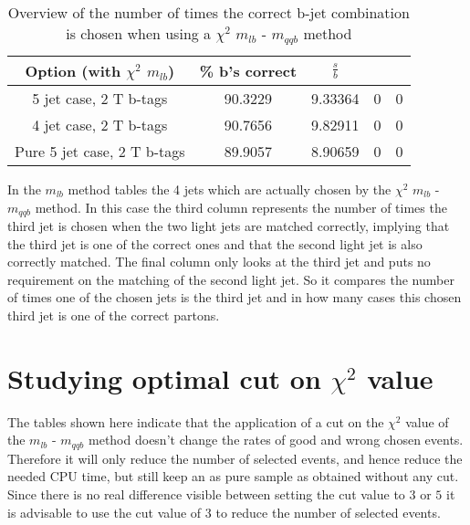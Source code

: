 \documentclass[a4paper,12pt]{report}
\begin{document}
 \begin{table}[!h] 
 \begin{tabular}{c|c|c|c|c} 
 \textbf{Option} (with $\chi^{2}$ $m_{lb}$) & \% b's correct   & $\frac{s}{b}$ &  &  \\ \hline 
 5 jet case,      2 T b-tags              & 90.3229 & 9.33364 & 0 & 0 \\ 
 4 jet case,      2 T b-tags              & 90.7656 & 9.82911 & 0 & 0 \\ 
 Pure 5 jet case, 2 T b-tags              & 89.9057 & 8.90659 & 0 & 0 \\ 
 \end{tabular} 
 \caption{Overview of the number of times the correct b-jet combination is chosen when using a $\chi^{2}$ $m_{lb}$ - $m_{qqb}$ method} 
 \end{table} 
In the $m_{lb}$ method tables the 4 jets which are actually chosen by the $\chi^{2}$ $m_{lb}$ - $m_{qqb}$ method. 
In this case the third column represents the number of times the third jet is chosen when the two light jets are matched correctly, implying that the third jet is one of the correct ones and that the second light jet is also correctly matched. The final column only looks at the third jet and puts no requirement on the matching of the second light jet. So it compares the number of times one of the chosen jets is the third jet and in how many cases this chosen third jet is one of the correct partons.
 
\section{Studying optimal cut on $\chi^{2}$ value}
The tables shown here indicate that the application of a cut on the $\chi^{2}$ value of the $m_{lb}$ - $m_{qqb}$ method doesn't change the rates of good and wrong chosen events. Therefore it will only reduce the number of selected events, and hence reduce the needed CPU time, but still keep an as pure sample as obtained without any cut.\\
Since there is no real difference visible between setting the cut value to $3$ or $5$ it is advisable to use the cut value of $3$ to reduce the number of selected events.
 
\end{document}
